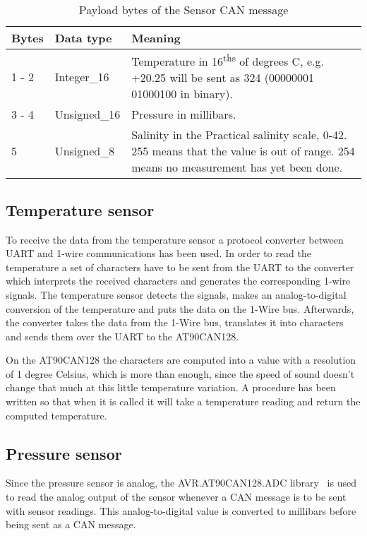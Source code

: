 \begin{table*}
\centering
    \caption{Payload bytes of the Sensor CAN message }
    \begin{tabular}{|l|l|p{11cm}|} \hline
    \label{table:SensorMessage}
    	\textbf{Bytes} & \textbf{Data type} & \textbf{Meaning} \\ \hline
        1 - 2 & Integer\_16 & Temperature in 16\textsuperscript{ths} of degrees C, e.g. +20.25 will be sent as 324 \newline 
        (00000001 01000100 in binary). \\ \hline
        3 - 4 & Unsigned\_16 & Pressure in millibars. \\ \hline
        5  & Unsigned\_8 & Salinity in the Practical salinity scale, 0-42. 255 means that the value is out of range. 254 means no measurement has yet been done. \\ \hline
    \end{tabular}
\end{table*}

\subsection{Temperature sensor}
To receive the data from the temperature sensor a protocol converter between UART and 1-wire communications has been used. In order to read the temperature a set of characters have to be sent from the UART to the converter which interprets the received characters and generates the corresponding 1-wire signals. The temperature sensor detects the signals, makes an analog-to-digital conversion of the temperature and puts the data on the 1-Wire bus. Afterwards, the converter takes the data from the 1-Wire bus, translates it into characters and sends them over the UART to the AT90CAN128. 

On the AT90CAN128 the characters are computed into a value with a resolution of 1 degree Celsius, which is more than enough, since the speed of sound doesn't change that much at this little temperature variation. A procedure has been written so that when it is called it will take a temperature reading and return the computed temperature.

\subsection{Pressure sensor}
Since the pressure sensor is analog, the AVR.AT90CAN128.ADC library~\cite{web:github_naiad-auv-software} is used to read the analog output of the sensor whenever a CAN message is to be sent with sensor readings. This analog-to-digital value is converted to millibars before being sent as a CAN message. 


